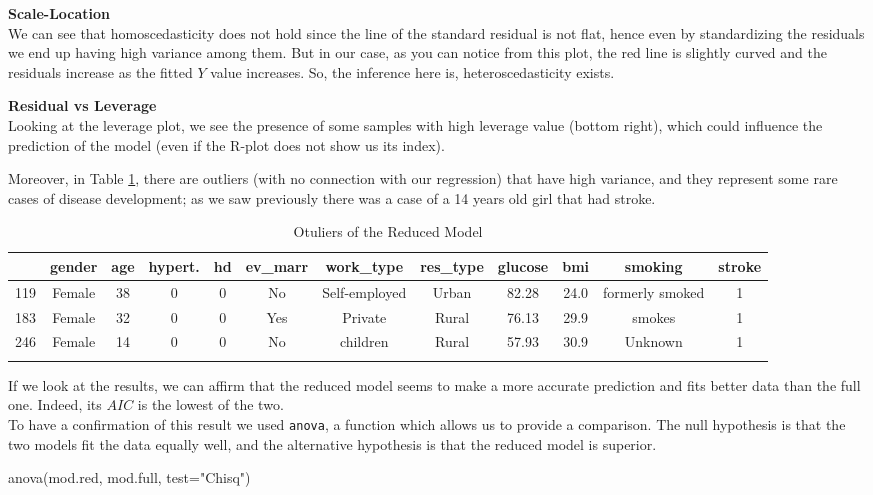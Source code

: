 \documentclass[
]{article}
\newenvironment{Shaded}{\begin{snugshade}}{\end{snugshade}}
\newcommand{\AttributeTok}[1]{\textcolor[rgb]{0.77,0.63,0.00}{#1}}
\newcommand{\FunctionTok}[1]{\textcolor[rgb]{0.00,0.00,0.00}{#1}}
\newcommand{\NormalTok}[1]{#1}
\newcommand{\StringTok}[1]{\textcolor[rgb]{0.31,0.60,0.02}{#1}}
\begin{document}
\textbf{Scale-Location}\\
We can see that homoscedasticity does not hold since the line of the
standard residual is not flat, hence even by standardizing the residuals
we end up having high variance among them. But in our case, as you can
notice from this plot, the red line is slightly curved and the residuals
increase as the fitted \(Y\) value increases. So, the inference here
is, heteroscedasticity exists.

\textbf{Residual vs Leverage}\\
Looking at the leverage plot, we see the presence of some samples with
high leverage value (bottom right), which could influence the prediction
of the model (even if the R-plot does not show us its index).

Moreover, in Table \ref{outliers_reduced}, there are outliers (with no connection with our regression) that have high variance, and they represent some rare cases of disease development; as we saw previously there was a case
of a 14 years old girl that had stroke.

\newpage
\begin{longtable}[]{@{}lccccccccccc@{}}
\toprule
& gender & age & hypert. & hd & ev\_marr & work\_type & res\_type &
glucose & bmi & smoking & stroke \\
\midrule
\endhead
119 & Female & 38 & 0 & 0 & No & Self-employed & Urban & 82.28 & 24.0 &
formerly smoked & 1 \\
183 & Female & 32 & 0 & 0 & Yes & Private & Rural & 76.13 & 29.9 &
smokes & 1 \\
246 & Female & 14 & 0 & 0 & No & children & Rural & 57.93 & 30.9 &
Unknown & 1 \\
\bottomrule
\caption{Otuliers of the Reduced Model}\label{outliers_reduced}
\end{longtable}

If we look at the results, we can affirm that the reduced model seems to make a more accurate prediction and fits better data than the full one. Indeed, its \(AIC\)
is the lowest of the two.\\
To have a confirmation of this result we used \texttt{anova}, a function
which allows us to provide a comparison. The null hypothesis is that the
two models fit the data equally well, and the alternative hypothesis is
that the reduced model is superior.

\begin{Shaded}
\begin{Highlighting}[]
\FunctionTok{anova}\NormalTok{(mod.red, mod.full, }\AttributeTok{test=}\StringTok{"Chisq"}\NormalTok{)}
\end{Highlighting}
\end{Shaded}
\end{document}
